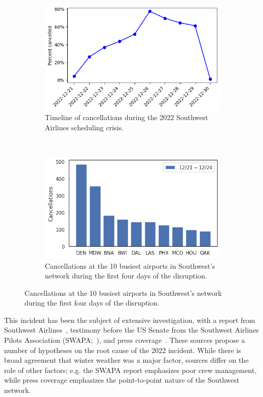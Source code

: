 \begin{figure}[tb]
    \centering
    \begin{subfigure}[t]{0.45\linewidth}
        \includegraphics[width=\linewidth]{images/icml/wn/wn_cancellations.png}
        \caption{Timeline of cancellations during the 2022 Southwest Airlines scheduling crisis.}
        \label{ch:icml:fig:wn_cancellations:timeline}
    \end{subfigure}\
    \begin{subfigure}[t]{0.45\linewidth}
        \includegraphics[width=\linewidth]{images/icml/wn/wn_cancellations_by_origin.png}
        \caption{Cancellations at the 10 busiest airports in Southwest's network during the first four days of the disruption.}
        \label{ch:icml:fig:wn_cancellations:cancellations}
    \end{subfigure}
\end{figure}

This incident has been the subject of extensive investigation, with a report from Southwest Airlines~\cite{southwestairlinesFinalSummaryAction2023}, testimony before the US Senate from the Southwest Airlines Pilots Association (SWAPA;~\cite{MurrayTestimony}), and press coverage~\cite{roseSouthwestWillPay2023,cramerWhatCausedChaos2022}. These sources propose a number of hypotheses on the root cause of the 2022 incident. While there is broad agreement that winter weather was a major factor, sources differ on the role of other factors; e.g. the SWAPA report emphasizes poor crew management, while press coverage emphasizes the point-to-point nature of the Southwest network.

